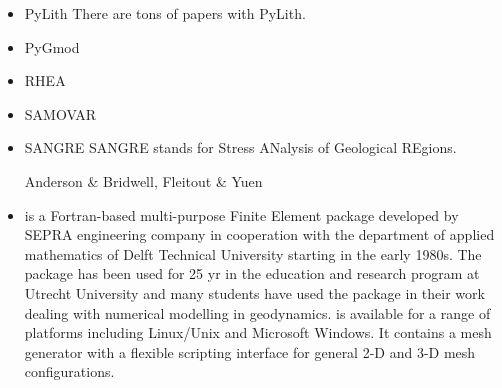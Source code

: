 \begin{itemize}
\item PyLith 
There are tons of papers with PyLith. 

{\small
\noindent
\cite{aakw13}
}

\item PyGmod 

{\small
\noindent
\cite{crvs15}
}


\item RHEA 

{\small
\noindent
\cite{bugg08}
\cite{stgb10}
\cite{algs12}
\cite{busa13}
}

\item SAMOVAR

{\small
\noindent
\cite{egat10}
}


\item {\codefont SANGRE} 
SANGRE stands for Stress ANalysis of Geological REgions.

\begin{scriptsize}
Anderson \& Bridwell\cite{anbr80},
Fleitout \& Yuen \cite{flyu84,flyu84b}
\end{scriptsize}

\item \sepran 
{}

\sepran \cite{sepr05} is a Fortran-based
multi-purpose Finite Element package developed by SEPRA engineering company in
cooperation with the department of applied mathematics of Delft Technical University
starting in the early 1980s. The package has been used for 25 yr in the education and
research program at Utrecht University and many students have used the package in
their work dealing with numerical modelling in geodynamics. \sepran is available for
a range of platforms including Linux/Unix and Microsoft Windows. It contains a mesh
generator with a flexible scripting interface for general 2-D and 3-D mesh configurations.


\end{itemize}

